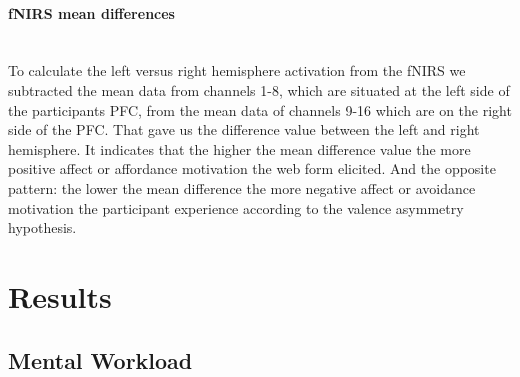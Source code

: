 \documentclass[a4paper]{report}
\begin{document}
				\paragraph{fNIRS mean differences}\leavevmode\\
				To calculate the left versus right hemisphere activation from the fNIRS we subtracted the mean data from channels 1-8, which are situated at the left side of the participants PFC, from the mean data of channels 9-16 which are on the right side of the PFC. That gave us the difference value between the left and right hemisphere. It indicates that the higher the mean difference value the more positive affect or affordance motivation the web form elicited. And the opposite pattern: the lower the mean difference the more negative affect or avoidance motivation the participant experience according to the valence asymmetry hypothesis.
				
	\section{Results}
		\subsection{Mental Workload}
\end{document}
